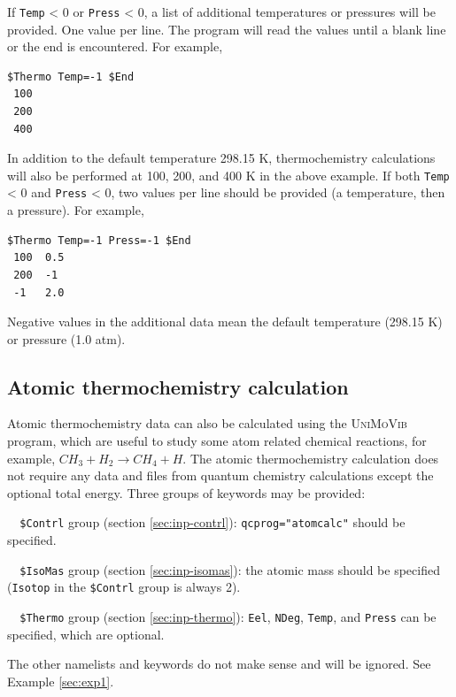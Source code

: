 \documentclass[12pt,english]{extarticle}
\begin{document}
\bigskip{}
If \verb|Temp| < 0 or \verb|Press| < 0, a list of additional temperatures or pressures will be provided. One value per line. The program will
read the values until a blank line or the end is encountered.
For example,
\begin{Verbatim}[frame=single]
 $Thermo Temp=-1 $End
 100
 200
 400
\end{Verbatim}
In addition to the default temperature 298.15 K, thermochemistry calculations will also be performed at 100, 200, and 400 K in the above example. If both \verb|Temp| < 0 and \verb|Press| < 0, two values per line should be provided (a temperature, then a pressure). For example,
\begin{Verbatim}[frame=single]
 $Thermo Temp=-1 Press=-1 $End
 100  0.5
 200  -1
 -1   2.0
\end{Verbatim}
Negative values in the additional data mean the default temperature (298.15 K) or pressure (1.0 atm).

\subsection{Atomic thermochemistry calculation} \label{sec:inp-atom}

Atomic thermochemistry data can also be calculated using the \textsc{UniMoVib} program, which are useful to
study some atom related chemical reactions, for example, $CH_3 + H_2 \rightarrow CH_4 + H$. The atomic
thermochemistry calculation does not require any data and files from quantum chemistry calculations except the
optional total energy. Three groups of keywords may be provided:

\begin{description}
\item[ ]\verb|  $Contrl| group (section \ref{sec:inp-contrl}): \verb|qcprog="atomcalc"| should be specified.
\item[ ]\verb|  $IsoMas| group (section \ref{sec:inp-isomas}): the atomic mass should be specified (\verb|Isotop| in the \verb|$Contrl| group is always 2).
\item[ ]\verb|  $Thermo| group (section \ref{sec:inp-thermo}): \verb|Eel|, \verb|NDeg|, \verb|Temp|, and \verb|Press| can be specified, which are optional.
\end{description}
The other namelists and keywords do not make sense and will be ignored. See Example \ref{sec:exp1}.
\end{document}

